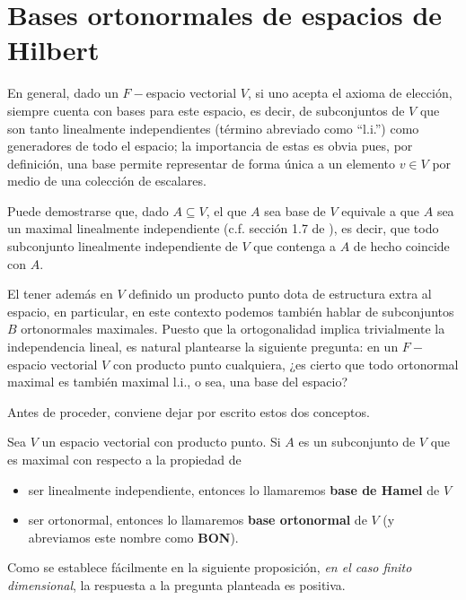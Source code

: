 \section{Bases ortonormales de espacios de Hilbert}
\label{Bases ortonormales de espacios de Hilbert}

En general, dado un $F-$espacio vectorial $V$,
si uno acepta el axioma de elección, siempre cuenta con 
bases para este espacio,
es decir, de subconjuntos de $V$ que son tanto linealmente
independientes (término abreviado como ``l.i.'') como generadores
de todo el espacio; la importancia de 
estas es obvia pues, por definición, una base permite representar
de forma única a un elemento $v \in V$ por medio
de una colección de escalares. 


Puede demostrarse
que, dado $A \subseteq V$, el que $A$ sea base de $V$
equivale a que $A$ sea un maximal linealmente
independiente (c.f. sección 1.7 de \cite{friedberg}), es decir,
que todo subconjunto  linealmente
independiente de $V$ que contenga
a $A$ de hecho coincide con $A$.


El tener además en $V$ definido un producto punto
dota de estructura extra al espacio, en particular, 
en este 
contexto podemos también hablar de subconjuntos $B$
ortonormales maximales. Puesto que la ortogonalidad implica
trivialmente la independencia lineal, es natural plantearse
la siguiente pregunta: en un $F-$espacio vectorial $V$
con producto punto
cualquiera, ¿es cierto que todo ortonormal maximal es también
maximal l.i., o sea, una base
del espacio? 

Antes de proceder, 
conviene dejar por escrito estos dos conceptos.

\begin{defi} \label{defi: BON y base de Hamel}
Sea $V$ un espacio vectorial con producto punto.
Si $A$ es un subconjunto de $V$ que es 
maximal con respecto a la propiedad de
\begin{itemize}
\item ser linealmente independiente, entonces lo llamaremos
\textbf{base de Hamel} de $V$
\item ser ortonormal, entonces lo llamaremos
\textbf{base ortonormal} de $V$ (y abreviamos este
nombre como \textbf{BON}).
\end{itemize}
\end{defi}


Como se establece 
fácilmente en la siguiente proposición,
\textit{en el caso finito dimensional}, la respuesta a la pregunta
planteada es positiva.

